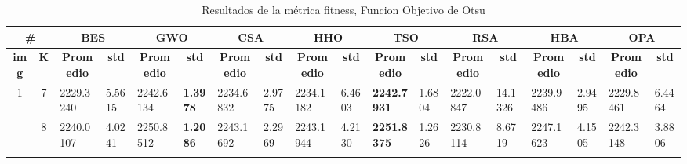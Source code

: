 \documentclass[conference]{IEEEtran}
\begin{document}
\begin{table*}[]
	\caption{Resultados de la métrica fitness, Funcion Objetivo de Otsu}
	\begin{tabular}{|cc|ll|ll|ll|ll|ll|ll|ll|ll|}
		\hline
		\multicolumn{2}{|c|}{\textbf{\#}}                      & \multicolumn{2}{c|}{\textbf{BES}}                                          & \multicolumn{2}{c|}{\textbf{GWO}}                                          & \multicolumn{2}{c|}{\textbf{CSA}}                                          & \multicolumn{2}{c|}{\textbf{HHO}}                                          & \multicolumn{2}{c|}{\textbf{TSO}}                                          & \multicolumn{2}{c|}{\textbf{RSA}}                                          & \multicolumn{2}{c|}{\textbf{HBA}}                                          & \multicolumn{2}{c|}{\textbf{OPA}}                                          \\ \hline
		\multicolumn{1}{|c|}{\textbf{img}}        & \textbf{K} & \multicolumn{1}{c|}{\textbf{Promedio}} & \multicolumn{1}{c|}{\textbf{std}} & \multicolumn{1}{c|}{\textbf{Promedio}} & \multicolumn{1}{c|}{\textbf{std}} & \multicolumn{1}{c|}{\textbf{Promedio}} & \multicolumn{1}{c|}{\textbf{std}} & \multicolumn{1}{c|}{\textbf{Promedio}} & \multicolumn{1}{c|}{\textbf{std}} & \multicolumn{1}{c|}{\textbf{Promedio}} & \multicolumn{1}{c|}{\textbf{std}} & \multicolumn{1}{c|}{\textbf{Promedio}} & \multicolumn{1}{c|}{\textbf{std}} & \multicolumn{1}{c|}{\textbf{Promedio}} & \multicolumn{1}{c|}{\textbf{std}} & \multicolumn{1}{c|}{\textbf{Promedio}} & \multicolumn{1}{c|}{\textbf{std}} \\ \hline
		\multicolumn{1}{|c|}{\multirow{3}{*}{1}}          & 7                               & \multicolumn{1}{l|}{2229.3240}         & 5.5615                            & \multicolumn{1}{l|}{2242.6134}          & \textbf{1.3978}                   & \multicolumn{1}{l|}{2234.6832}         & 2.9775                            & \multicolumn{1}{l|}{2234.1182}         & 6.4603                            & \multicolumn{1}{l|}{\textbf{2242.7931}} & 1.6804                            & \multicolumn{1}{l|}{2222.0847}         & 14.1326                           & \multicolumn{1}{l|}{2239.9486}         & 2.9495                            & \multicolumn{1}{l|}{2229.8461}         & 6.4464                            \\ \cline{2-18} 
		\multicolumn{1}{|c|}{}                            & 8                               & \multicolumn{1}{l|}{2240.0107}         & 4.0241                            & \multicolumn{1}{l|}{2250.8512}          & \textbf{1.2086}                   & \multicolumn{1}{l|}{2243.1692}         & 2.2969                            & \multicolumn{1}{l|}{2243.1944}         & 4.2130                            & \multicolumn{1}{l|}{\textbf{2251.8375}} & 1.2626                            & \multicolumn{1}{l|}{2230.8114}         & 8.6719                            & \multicolumn{1}{l|}{2247.1623}         & 4.1505                            & \multicolumn{1}{l|}{2242.3148}         & 3.8806                            \\ \cline{2-18} 

\end{tabular}
\end{table*}
\end{document}
